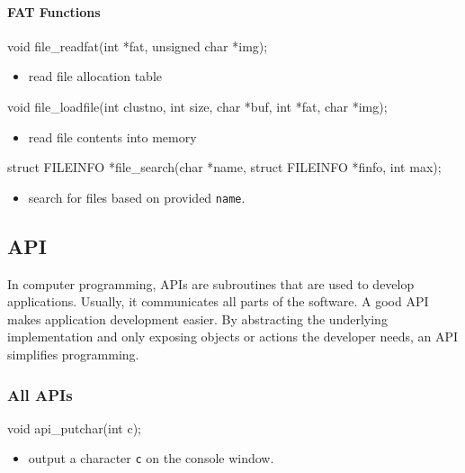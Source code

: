 \documentclass{swfcthesis}
\begin{document}
\paragraph{FAT Functions}

\begin{ccode}
void file_readfat(int *fat, unsigned char *img);
\end{ccode}
\begin{itemize}
\item read file allocation table
\end{itemize}

\begin{ccode}
void file_loadfile(int clustno, int size, char *buf, int *fat, char *img);
\end{ccode}
\begin{itemize}
\item read file contents into memory
\end{itemize}


\begin{ccode}
struct FILEINFO *file_search(char *name, struct FILEINFO *finfo, int max);
\end{ccode}
\begin{itemize}
\item search for files based on provided \texttt{name}.
\end{itemize}


\subsection{API}
\label{sec:api}
In computer programming, APIs are subroutines that are used to develop
applications. Usually, it communicates all parts of the software. A good API makes
application development easier. By abstracting the underlying implementation and only
exposing objects or actions the developer needs, an API simplifies programming.

\subsubsection{All APIs}
\label{sec:all-apis}


\begin{ccode}
void api_putchar(int c);
\end{ccode}
\begin{itemize}
\item output a character \texttt{c} on the console window.
\end{itemize}
\end{document}

